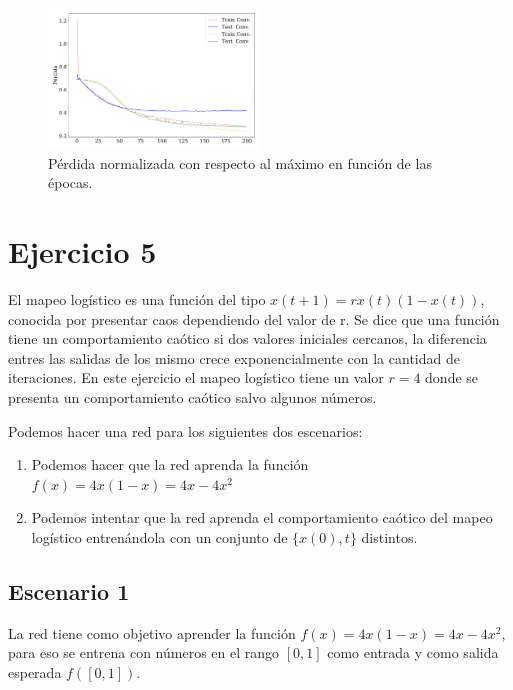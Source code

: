     \begin{figure}[H]
        \begin{small}
            \begin{center}
                \includegraphics[width=0.5\textwidth]{Graphs/ejer4_loss.pdf}
            \end{center}
            \caption{Pérdida normalizada con respecto al máximo en función de las épocas. }
            \label{fig:ejer4_loss}
        \end{small}
    \end{figure}



\section*{Ejercicio 5}

    El mapeo logístico es una función del tipo $x(t+1) = r x(t)(1-x(t))$, conocida por presentar caos dependiendo del valor de r. Se dice que una función tiene un comportamiento caótico si dos valores iniciales  cercanos, la diferencia entres las salidas de los mismo crece exponencialmente con la cantidad de iteraciones.  En este ejercicio el mapeo logístico tiene un valor $r=4$ donde se presenta un comportamiento caótico salvo algunos números. 

    Podemos hacer una red para los siguientes dos escenarios:
    \begin{enumerate}
        \item Podemos hacer que la red aprenda la función $f(x)= 4x(1-x)=4x-4x^2$
        \item Podemos intentar que la red aprenda el comportamiento caótico del mapeo logístico entrenándola con un conjunto de $\{ x(0), t\}$ distintos.
    \end{enumerate}

    \subsection*{Escenario 1}
    La red tiene como objetivo aprender la función $f(x)= 4x(1-x)=4x-4x^2$, para eso se entrena con números en el rango  $[0,1]$ como entrada y como salida esperada $f([0,1])$.

